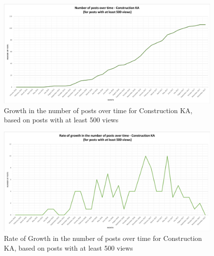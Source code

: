 \documentclass{sigchi}
\begin{document}
\begin{figure}[ht]
	\centering
\includegraphics[width=\textwidth,height=\textheight,keepaspectratio]{RQ5-ConstructionNumPostsOverTime_500Views.png}
    \caption{Growth in the number of posts over time for Construction KA, based on posts with at least 500 views}
    \label{fig:6ConstructionGrowthInNumPosts500Views}
\end{figure}
\begin{figure}[ht]
	\centering
\includegraphics[width=\textwidth,height=\textheight,keepaspectratio]{RQ5-ConstructionRateNumPostsOverTime_500Views.png}
    \caption{Rate of Growth in the number of posts over time for Construction KA, based on posts with at least 500 views}
    \label{fig:6.1ConstructionRateGrowthInNumPosts500Views}
\end{figure}
\end{document}
